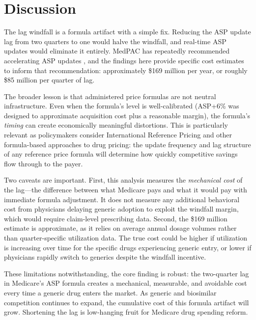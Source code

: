 \documentclass[12pt]{article}
\begin{document}
\label{apep_main_text_end}


\section{Discussion}\label{sec:discussion}

The lag windfall is a formula artifact with a simple fix. Reducing the ASP update lag from two quarters to one would halve the windfall, and real-time ASP updates would eliminate it entirely. MedPAC has repeatedly recommended accelerating ASP updates \citep{medpac2023}, and the findings here provide specific cost estimates to inform that recommendation: approximately \$169 million per year, or roughly \$85 million per quarter of lag.

The broader lesson is that administered price formulas are not neutral infrastructure. Even when the formula's level is well-calibrated (ASP+6\% was designed to approximate acquisition cost plus a reasonable margin), the formula's \textit{timing} can create economically meaningful distortions. This is particularly relevant as policymakers consider International Reference Pricing and other formula-based approaches to drug pricing: the update frequency and lag structure of any reference price formula will determine how quickly competitive savings flow through to the payer.

Two caveats are important. First, this analysis measures the \textit{mechanical cost} of the lag---the difference between what Medicare pays and what it would pay with immediate formula adjustment. It does not measure any additional behavioral cost from physicians delaying generic adoption to exploit the windfall margin, which would require claim-level prescribing data. Second, the \$169 million estimate is approximate, as it relies on average annual dosage volumes rather than quarter-specific utilization data. The true cost could be higher if utilization is increasing over time for the specific drugs experiencing generic entry, or lower if physicians rapidly switch to generics despite the windfall incentive.

These limitations notwithstanding, the core finding is robust: the two-quarter lag in Medicare's ASP formula creates a mechanical, measurable, and avoidable cost every time a generic drug enters the market. As generic and biosimilar competition continues to expand, the cumulative cost of this formula artifact will grow. Shortening the lag is low-hanging fruit for Medicare drug spending reform.
\end{document}
